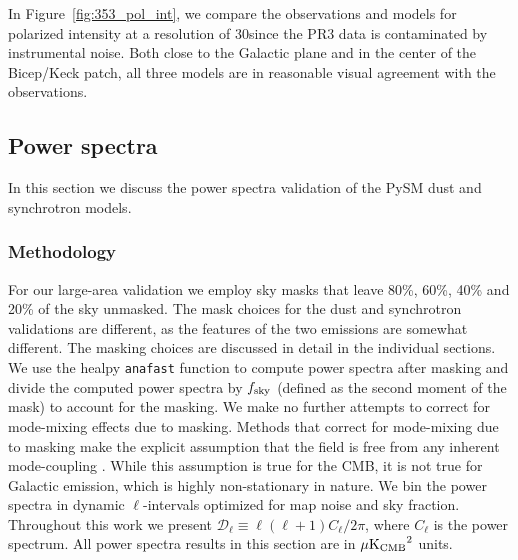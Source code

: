\documentclass[twocolumn]{aastex631}
\begin{document}

In Figure~\ref{fig:353_pol_int}, we compare the observations and models for polarized intensity at a resolution of 30\arcmin since the PR3 data is contaminated by instrumental noise. 
Both close to the Galactic plane and in the center of the Bicep/Keck patch, all three models are in reasonable visual agreement with the observations. 

\subsection{Power spectra}
\label{sec:PS-validation}
In this section we discuss the power spectra validation of the PySM dust and synchrotron models. 

\subsubsection{Methodology}
For our large-area validation we employ sky masks that leave 80\%, 60\%, 40\% and 20\% of the sky unmasked. The mask choices for the dust and synchrotron validations are different, as the features of the two emissions are somewhat different. The masking choices are discussed in detail in the individual sections. We use the healpy \texttt{anafast} function to compute power spectra after masking and divide the computed power spectra by $f_{\rm sky}$ (defined as the second moment of the mask) to account for the masking. We make no further attempts to correct for mode-mixing effects due to masking. Methods that correct for mode-mixing due to masking make the explicit assumption that the field is free from any inherent mode-coupling \citep[e.g.,][]{Hivon:2002}. While this assumption is true for the CMB, it is not true for Galactic emission, which is highly non-stationary in nature. We bin the power spectra in dynamic $\ell$-intervals optimized for map noise and sky fraction. Throughout this work we present $\mathcal{D}_\ell \equiv \ell(\ell + 1) C_\ell / 2\pi$, where $C_\ell$ is the power spectrum. All power spectra results in this section are in $\mu{\rm K_{CMB}}^2$ units. 
\end{document}
